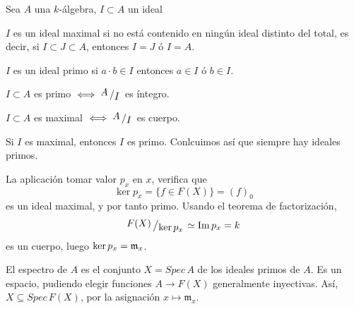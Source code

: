     Sea $A$ una $k$-\'algebra, $I\subset A$ un ideal
    \begin{defi}
        $I$ es un ideal maximal si no est\'a contenido en ning\'un ideal distinto del total, es decir, si $I\subset J \subset A$, entonces $I=J$ \'o $I=A$. 
    \end{defi}
    \begin{defi}
        $I$ es un ideal primo si $a\cdot b \in I$ entonces $a\in I$ \'o $b\in I$. 
    \end{defi}
    \begin{prop}
        $I\subset A$ es primo $\iff \modulo{A}{I}$ es \'integro.
    \end{prop}
    \begin{prop}
        $I\subset A$ es maximal $\iff \modulo{A}{I}$ es cuerpo.
    \end{prop}
    \begin{cor}
        Si $I$ es maximal, entonces $I$ es primo. Conlcuimos as\'i que siempre hay ideales primos. 
    \end{cor}
    \begin{ejem}
        La aplicaci\'on tomar valor $p_x$ en $x$, verifica que 
        $$\ker p_x = \{f\in F(X)\}= (f)_0$$ es un ideal maximal, y por tanto primo. Usando el teorema de factorizaci\'on, 
        $$\modulo{F(X)}{\ker p_x} \simeq \Im p_x = k$$
        es un cuerpo, luego $\ker p_x = \mathfrak{m}_x$. 
    \end{ejem}
    \begin{defi}
        El espectro de $A$ es el conjunto $X=Spec \, A$ de los ideales primos de $A$. Es un espacio, pudiendo elegir funciones $A\longrightarrow F(X)$ generalmente inyectivas. As\'i, $X\subseteq Spec \, F(X)$, por la asignaci\'on $x\mapsto \mathfrak m_x$. 
    \end{defi}
